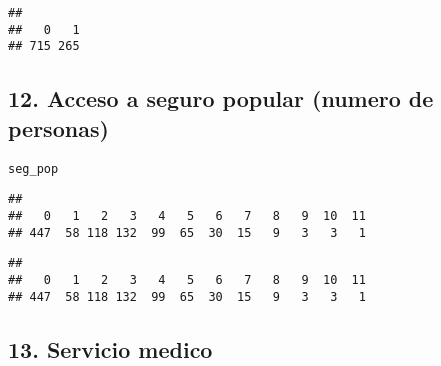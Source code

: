 \documentclass[11pt,]{article}
\newenvironment{Shaded}{\begin{snugshade}}{\end{snugshade}}
\newcommand{\KeywordTok}[1]{\textcolor[rgb]{0.13,0.29,0.53}{\textbf{#1}}}
\newcommand{\DecValTok}[1]{\textcolor[rgb]{0.00,0.00,0.81}{#1}}
\newcommand{\StringTok}[1]{\textcolor[rgb]{0.31,0.60,0.02}{#1}}
\newcommand{\CommentTok}[1]{\textcolor[rgb]{0.56,0.35,0.01}{\textit{#1}}}
\newcommand{\OperatorTok}[1]{\textcolor[rgb]{0.81,0.36,0.00}{\textbf{#1}}}
\newcommand{\NormalTok}[1]{#1}
\begin{document}
\begin{Shaded}
\end{Shaded}

\begin{verbatim}
## 
##   0   1 
## 715 265
\end{verbatim}

\subsection{12. Acceso a seguro popular (numero de
personas)}\label{acceso-a-seguro-popular-numero-de-personas}

\texttt{seg\_pop}

\begin{Shaded}
\end{Shaded}

\begin{verbatim}
## 
##   0   1   2   3   4   5   6   7   8   9  10  11 
## 447  58 118 132  99  65  30  15   9   3   3   1
\end{verbatim}

\begin{Shaded}
\end{Shaded}

\begin{verbatim}
## 
##   0   1   2   3   4   5   6   7   8   9  10  11 
## 447  58 118 132  99  65  30  15   9   3   3   1
\end{verbatim}

\subsection{13. Servicio medico}\label{servicio-medico}
\end{document}
